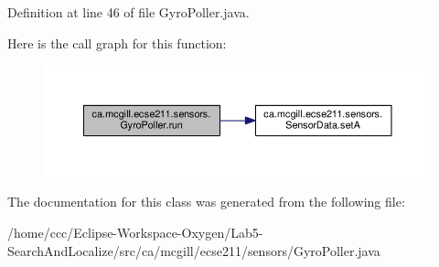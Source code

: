 Definition at line 46 of file Gyro\+Poller.\+java.

Here is the call graph for this function\+:
\nopagebreak
\begin{figure}[H]
\begin{center}
\leavevmode
\includegraphics[width=350pt]{classca_1_1mcgill_1_1ecse211_1_1sensors_1_1_gyro_poller_a2a52059192555ece72190fa44a761d28_cgraph}
\end{center}
\end{figure}


The documentation for this class was generated from the following file\+:\begin{DoxyCompactItemize}
\item 
/home/ccc/\+Eclipse-\/\+Workspace-\/\+Oxygen/\+Lab5-\/\+Search\+And\+Localize/src/ca/mcgill/ecse211/sensors/Gyro\+Poller.\+java\end{DoxyCompactItemize}
